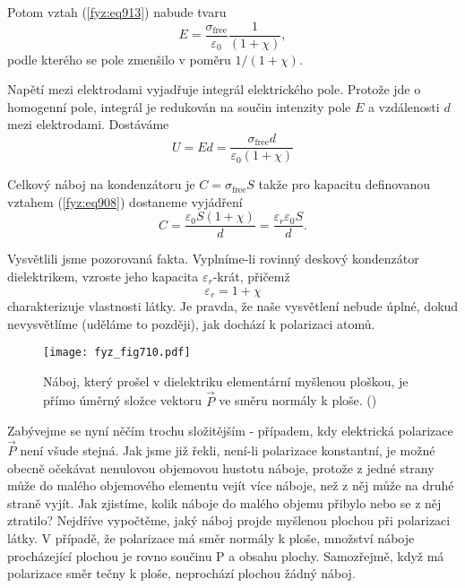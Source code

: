     Potom vztah (\ref{fyz:eq913}) nabude tvaru
    \begin{equation}\label{fyz:eq915}
      E=\dfrac{σ_{\text{free}}}{\varepsilon_0}\dfrac{1}{(1+χ)},
    \end{equation}
    podle kterého se pole zmenšilo v poměru \(1/(1+χ)\).

    Napětí mezi elektrodami vyjadřuje integrál elektrického pole. Protože jde o homogenní pole,
    integrál je redukován na součin intenzity pole \(E\) a vzdálenosti \(d\) mezi elektrodami.
    Dostáváme
    \begin{equation*}
      U = Ed = \dfrac{σ_{\text{free}}d}{\varepsilon_0(1+χ)}
    \end{equation*}

    Celkový náboj na kondenzátoru je \(C = σ_{\text{free}}S\) takže pro kapacitu definovanou vztahem
    (\ref{fyz:eq908}) dostaneme vyjádření
    \begin{equation}\label{fyz:eq916}
      C=\dfrac{\varepsilon_0S(1+χ)}{d} = \dfrac{\varepsilon_r\varepsilon_0S}{d}.
    \end{equation}

    Vysvětlili jsme pozorovaná fakta. Vyplníme-li rovinný deskový kondenzátor dielektrikem, vzroste
    jeho kapacita \(\varepsilon_r\)-krát, přičemž
    \begin{equation}\label{fyz:eq917}
      \varepsilon_r = 1+χ
    \end{equation}
    charakterizuje vlastnosti látky. Je pravda, že naše vysvětlení nebude úplné, dokud nevysvětlíme
    (uděláme to později), jak dochází k polarizaci atomů.

    \begin{figure}[ht!] %
      \centering
      \texttt{[image: fyz\_fig710.pdf]}
      \caption{Náboj, který prošel v dielektriku elementární myšlenou ploškou, je přímo úměrný
               složce vektoru \(\vec{P}\) ve směru normály k ploše. (\cite[s.~179]{Feynman02})}
      \label{fyz:fig710}
    \end{figure}

    Zabývejme se nyní něčím trochu složitějším - případem, kdy elektrická polarizace \(\vec{P}\)
    není všude stejná. Jak jsme již řekli, není-li polarizace konstantní, je možné obecně očekávat
    nenulovou objemovou hustotu náboje, protože z jedné strany může do malého objemového elementu
    vejít více náboje, než z něj může na druhé straně vyjít. Jak zjistíme, kolik náboje do malého
    objemu přibylo nebo se z něj ztratilo? Nejdříve vypočtěme, jaký náboj projde myšlenou plochou
    při polarizaci látky. V případě, že polarizace má směr normály k ploše, množství náboje
    procházející plochou je rovno součinu P a obsahu plochy. Samozřejmě, když má polarizace směr
    tečny k ploše, neprochází plochou žádný náboj.

